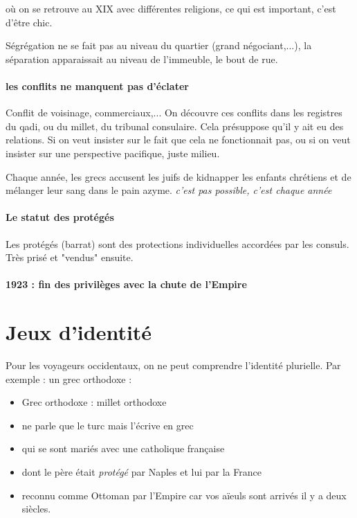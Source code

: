 \begin{Ex}
    où on se retrouve au XIX avec différentes religions, ce qui est important, c'est d'être chic.
\end{Ex}

\begin{Ex}[Alexandrie]
    Ségrégation ne se fait pas au niveau du quartier (grand négociant,...), la séparation apparaissait au niveau de l'immeuble, le bout de rue. 
\end{Ex}

\paragraph{les conflits ne manquent pas d'éclater} Conflit de voisinage, commerciaux,... On découvre ces conflits dans les registres du qadi, ou du millet, du tribunal consulaire. Cela présuppose qu'il y ait eu des relations.
Si on veut insister sur le fait que cela ne fonctionnait pas, ou si on veut insister sur une perspective pacifique, juste milieu. 

\begin{Ex}
    Chaque année, les grecs accusent les juifs de kidnapper les enfants chrétiens et de mélanger leur sang dans le pain azyme. \textit{c'est pas possible, c'est chaque année}
\end{Ex}

\paragraph{Le statut des protégés} Les protégés (barrat) sont des protections individuelles accordées par les consuls. Très prisé et "vendus" ensuite.

\paragraph{1923 : fin des privilèges avec la chute de l'Empire} 



\section{Jeux d'identité}

Pour les voyageurs occidentaux, on ne peut comprendre l'identité plurielle.
Par exemple : un grec orthodoxe : 
\begin{itemize}
    \item Grec orthodoxe : millet orthodoxe
    \item ne parle que le turc mais l'écrive en grec
    \item qui se sont mariés avec une catholique française
    \item dont le père était \textit{protégé} par Naples et lui par la France
    \item reconnu comme Ottoman par l'Empire car vos aïeuls sont arrivés il y a deux siècles. 
\end{itemize}
